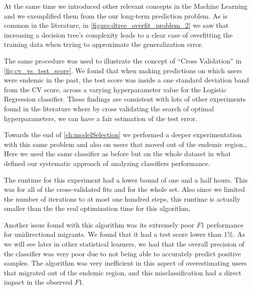 At the same time we introduced other relevant concepts in the Machine Learning and we exemplified them from the our long-term prediction problem.
As is common in the literature, in \cref{figure:dtree_overfit_problem_2} we saw that increasing a decision tree's complexity leads to a clear case of overfitting the training data when trying to approximate the generalization error.

The same procedure was used to illustrate the concept of ``Cross Validation'' in \cref{fig:cv_vs_test_score}.
We found that when making predictions on which users were endemic in the past, the test score was inside a one standard deviation band from the CV score, across a varying hyperparameter value for the Logistic Regression classifier.
These findings are consistent with lots of other experiments found in the literature where by cross validating the search of optimal hyperparameters, we can have a fair estimation of the test error.


Towards the end of \cref{ch:modelSelection} we performed a deeper experimentation with this same problem and also on users that moved out of the endemic region.,
Here we used the same classifier as before but on the whole dataset in what defined our systematic approach of analyzing classifiers performance.


The runtime for this experiment had a lower bound of one and a half hours.
This was for all of the cross-validated fits and for the whole set.
Also since we limited the number of iterations to at most one hundred steps, this runtime is actually smaller than the the real optimization time for this algorithm,

Another issue found with this algorithm was its extremely poor $F1$ performance for unidirectional migrants.
We found that it had a test score lower than $1\%$.
As we will see later in other statistical learners, we had that
the overall precision of the classifier was very poor due to not being able to accurately predict positive samples.
The algorithm was very inefficient in this aspect of overestimating users that migrated out of the endemic region, and this misclassification had a direct impact in the observed $F1$.


